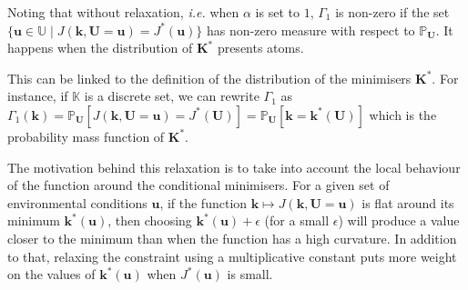 \documentclass[preprint, 1p]{elsarticle}
\newcommand{\Prob}{\mathbb{P}}
\newcommand{\Kspace}{\mathbb{K}}
\newcommand{\Uspace}{\mathbb{U}}
\begin{document}
Noting that without relaxation, \textit{i.e.} when $\alpha$ is set to $1$, $\Gamma_1$ is non-zero if the set $\{\mathbf{u}\in\Uspace \mid J(\mathbf{k},\mathbf{U}=\mathbf{u}) = J^*(\mathbf{u})\}$ has non-zero measure with respect to $\Prob_{\mathbf{U}}$. It happens when the distribution of $\mathbf{K}^*$ presents atoms.

This can be linked to the definition of the distribution of the minimisers $\mathbf{K}^*$. For instance, if $\Kspace$ is a discrete set, we can rewrite $\Gamma_1$ as $\Gamma_1(\mathbf{k})=\Prob_{\mathbf{U}}\left[J(\mathbf{k},\mathbf{U}=\mathbf{u}) = J^*(\mathbf{U})\right] = \Prob_{\mathbf{U}}\left[\mathbf{k} = \mathbf{k}^*(\mathbf{U})\right]$ which is the probability mass function of $\mathbf{K}^*$.

The motivation behind this relaxation is to take into account the local behaviour of the function around the conditional minimisers.
For a given set of environmental conditions $\mathbf{u}$, if the function $\mathbf{k} \mapsto J(\mathbf{k},\mathbf{U}=\mathbf{u})$ is flat around its minimum $\mathbf{k}^*(\mathbf{u})$, then choosing  $\mathbf{k}^*(\mathbf{u}) + \epsilon$ (for a small $\epsilon$) will produce a value closer to the minimum than when the function has a high curvature.
In addition to that, relaxing the constraint using a multiplicative constant puts more weight on the values of $\mathbf{k}^*(\mathbf{u})$ when $J^*(\mathbf{u})$ is small.
\end{document}
